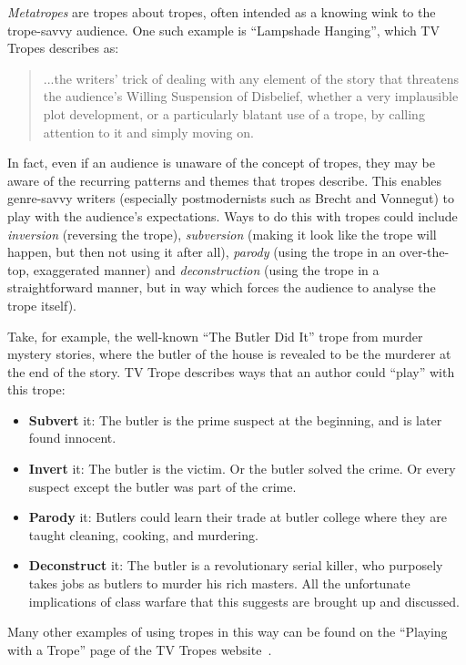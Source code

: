 \documentclass[11pt]{report}
\begin{document}
\emph{Metatropes} are tropes about tropes, often intended as a knowing wink to
the trope-savvy audience. One such example is ``Lampshade Hanging'', which TV
Tropes describes as:

\begin{quote}
...the writers' trick of dealing with any element of the story that threatens the audience's Willing Suspension of Disbelief, whether a very implausible plot development, or a particularly blatant use of a trope, by calling attention to it and simply moving on.
\end{quote}

In fact, even if an audience is unaware of the concept of tropes, they may be aware
of the recurring patterns and themes that tropes describe. This enables
genre-savvy writers (especially postmodernists such as Brecht and Vonnegut) to play with the audience's
expectations. Ways to do this with tropes could include \emph{inversion}
(reversing the trope),
\emph{subversion} (making it look like the trope will happen, but then not using
it after all), \emph{parody} (using the trope in an over-the-top, exaggerated
manner) and \emph{deconstruction} (using the trope in a straightforward manner,
but in way which forces the audience to analyse the trope itself).

Take, for example, the well-known ``The Butler Did It'' trope from murder
mystery stories, where the butler of the house is revealed to be the murderer at
the end of the story. TV Trope describes ways that an author could ``play'' with this trope:

\begin{itemize}
  \item \textbf{Subvert} it: The butler is the prime suspect at the beginning, and is later found innocent.
  \item \textbf{Invert} it: The butler is the victim. Or the butler solved the crime. Or every suspect except the butler was part of the crime.
  \item \textbf{Parody} it: Butlers could learn their trade at butler college where they are taught cleaning, cooking, and murdering.
  \item \textbf{Deconstruct} it: The butler is a revolutionary serial killer, who purposely takes jobs as butlers to murder his rich masters. All the unfortunate implications of class warfare that this suggests are brought up and discussed.
\end{itemize}

Many other examples of using tropes in this way can be found on the ``Playing
with a Trope'' page of the TV Tropes website~\citep{playing-tropes}.
\end{document}
